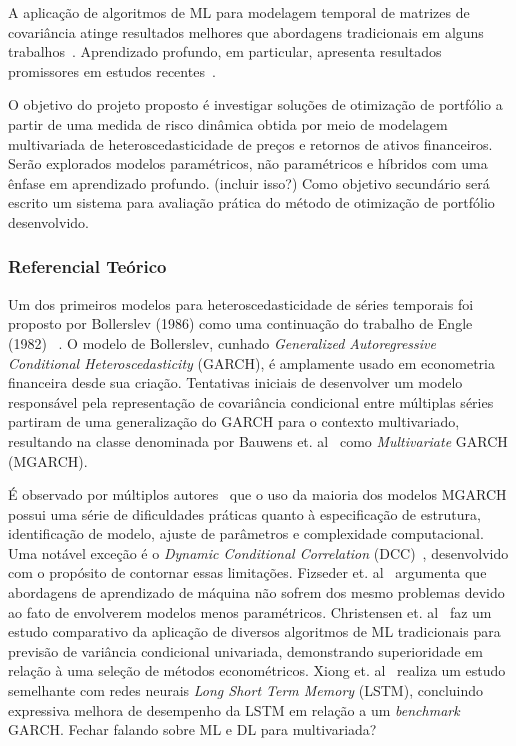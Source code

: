 \documentclass[a4paper, 12pt]{article}
\begin{document}
\begin{spacing}{.9  }
A aplicação de algoritmos de ML para modelagem temporal de matrizes de
covariância atinge resultados melhores que abordagens tradicionais em alguns
trabalhos~\cite{svr, ann}. Aprendizado profundo, em particular, apresenta
resultados promissores em estudos recentes~\cite{multi_dl, dl2}.

O objetivo do projeto proposto é investigar soluções de otimização de portfólio
a partir de uma medida de risco dinâmica obtida por meio de modelagem
multivariada de heteroscedasticidade de preços e retornos de ativos
financeiros. Serão explorados modelos paramétricos, não paramétricos e híbridos
com uma ênfase em aprendizado profundo. (incluir isso?) Como objetivo
secundário será escrito um sistema para avaliação prática do método de
otimização de portfólio desenvolvido.




\subsubsection*{Referencial Teórico}

Um dos primeiros modelos para heteroscedasticidade de séries temporais foi
proposto por Bollerslev (1986) como uma continuação do trabalho de Engle (1982)
~\cite{garch}. O modelo de Bollerslev, cunhado \emph{Generalized Autoregressive
Conditional Heteroscedasticity} (GARCH), é amplamente usado em econometria
financeira desde sua criação. Tentativas iniciais de desenvolver um modelo
responsável pela representação de covariância condicional entre múltiplas
séries partiram de uma generalização do GARCH para o contexto multivariado,
resultando na classe denominada por Bauwens et. al~\cite{bauwens} como
\emph{Multivariate} GARCH (MGARCH).

É observado por múltiplos autores~\cite{bauwens, morettin} que o uso da maioria
dos modelos MGARCH possui uma série de dificuldades práticas quanto à
especificação de estrutura, identificação de modelo, ajuste de parâmetros e
complexidade computacional. Uma notável exceção é o \emph{Dynamic Conditional
Correlation} (DCC)~\cite{dcc}, desenvolvido com o propósito de contornar essas
limitações. Fizseder et. al~\cite{svr} argumenta que abordagens de aprendizado
de máquina não sofrem dos mesmo problemas devido ao fato de envolverem modelos
menos paramétricos. Christensen et. al~\cite{christensen} faz um estudo
comparativo da aplicação de diversos algoritmos de ML tradicionais para
previsão de variância condicional univariada, demonstrando superioridade em
relação à uma seleção de métodos econométricos. Xiong et. al~\cite{xiong}
realiza um estudo semelhante com redes neurais \emph{Long Short Term Memory}
(LSTM), concluindo expressiva melhora de desempenho da LSTM em relação a um
\emph{benchmark} GARCH. Fechar falando sobre ML e DL para multivariada?


\end{spacing}
\end{document}
